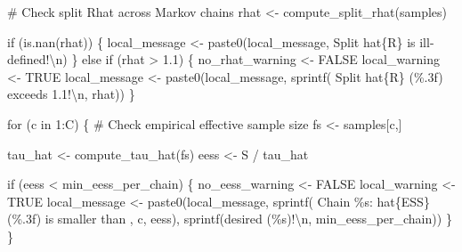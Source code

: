 \documentclass[
  letterpaper,
  DIV=11,
  numbers=noendperiod]{scrartcl}
\newenvironment{Shaded}{\begin{snugshade}}{\end{snugshade}}
\newcommand{\CommentTok}[1]{\textcolor[rgb]{0.37,0.37,0.37}{#1}}
\newcommand{\ConstantTok}[1]{\textcolor[rgb]{0.56,0.35,0.01}{#1}}
\newcommand{\ControlFlowTok}[1]{\textcolor[rgb]{0.00,0.23,0.31}{#1}}
\newcommand{\DecValTok}[1]{\textcolor[rgb]{0.68,0.00,0.00}{#1}}
\newcommand{\FloatTok}[1]{\textcolor[rgb]{0.68,0.00,0.00}{#1}}
\newcommand{\FunctionTok}[1]{\textcolor[rgb]{0.28,0.35,0.67}{#1}}
\newcommand{\NormalTok}[1]{\textcolor[rgb]{0.00,0.23,0.31}{#1}}
\newcommand{\OtherTok}[1]{\textcolor[rgb]{0.00,0.23,0.31}{#1}}
\newcommand{\SpecialCharTok}[1]{\textcolor[rgb]{0.37,0.37,0.37}{#1}}
\newcommand{\StringTok}[1]{\textcolor[rgb]{0.13,0.47,0.30}{#1}}
\begin{document}
\begin{Shaded}
\begin{Highlighting}[]
    \CommentTok{\# Check split Rhat across Markov chains}
\NormalTok{    rhat }\OtherTok{\textless{}{-}} \FunctionTok{compute\_split\_rhat}\NormalTok{(samples)}

    \ControlFlowTok{if}\NormalTok{ (}\FunctionTok{is.nan}\NormalTok{(rhat)) \{}
\NormalTok{      local\_message }\OtherTok{\textless{}{-}} \FunctionTok{paste0}\NormalTok{(local\_message,}
                              \StringTok{\textquotesingle{}  Split hat\{R\} is ill{-}defined!}\SpecialCharTok{\textbackslash{}n}\StringTok{\textquotesingle{}}\NormalTok{)}
\NormalTok{    \} }\ControlFlowTok{else} \ControlFlowTok{if}\NormalTok{ (rhat }\SpecialCharTok{\textgreater{}} \FloatTok{1.1}\NormalTok{) \{}
\NormalTok{      no\_rhat\_warning }\OtherTok{\textless{}{-}} \ConstantTok{FALSE}
\NormalTok{      local\_warning }\OtherTok{\textless{}{-}} \ConstantTok{TRUE}
\NormalTok{      local\_message }\OtherTok{\textless{}{-}}
        \FunctionTok{paste0}\NormalTok{(local\_message,}
               \FunctionTok{sprintf}\NormalTok{(}\StringTok{\textquotesingle{}  Split hat\{R\} (\%.3f) exceeds 1.1!}\SpecialCharTok{\textbackslash{}n}\StringTok{\textquotesingle{}}\NormalTok{, rhat))}
\NormalTok{    \}}

    \ControlFlowTok{for}\NormalTok{ (c }\ControlFlowTok{in} \DecValTok{1}\SpecialCharTok{:}\NormalTok{C) \{}
      \CommentTok{\# Check empirical effective sample size}
\NormalTok{      fs }\OtherTok{\textless{}{-}}\NormalTok{ samples[c,]}
      
\NormalTok{      tau\_hat }\OtherTok{\textless{}{-}} \FunctionTok{compute\_tau\_hat}\NormalTok{(fs)}
\NormalTok{      eess }\OtherTok{\textless{}{-}}\NormalTok{ S }\SpecialCharTok{/}\NormalTok{ tau\_hat}
      
      \ControlFlowTok{if}\NormalTok{ (eess }\SpecialCharTok{\textless{}}\NormalTok{ min\_eess\_per\_chain) \{}
\NormalTok{        no\_eess\_warning }\OtherTok{\textless{}{-}} \ConstantTok{FALSE}
\NormalTok{        local\_warning }\OtherTok{\textless{}{-}} \ConstantTok{TRUE}
\NormalTok{        local\_message }\OtherTok{\textless{}{-}}
          \FunctionTok{paste0}\NormalTok{(local\_message,}
                 \FunctionTok{sprintf}\NormalTok{(}\StringTok{\textquotesingle{}  Chain \%s: hat\{ESS\} (\%.3f) is smaller than \textquotesingle{}}\NormalTok{,}
\NormalTok{                         c, eess),}
                 \FunctionTok{sprintf}\NormalTok{(}\StringTok{\textquotesingle{}desired (\%s)!}\SpecialCharTok{\textbackslash{}n}\StringTok{\textquotesingle{}}\NormalTok{, min\_eess\_per\_chain))}
\NormalTok{      \}}
\NormalTok{    \}}
    

\end{Highlighting}
\end{Shaded}
\end{document}
